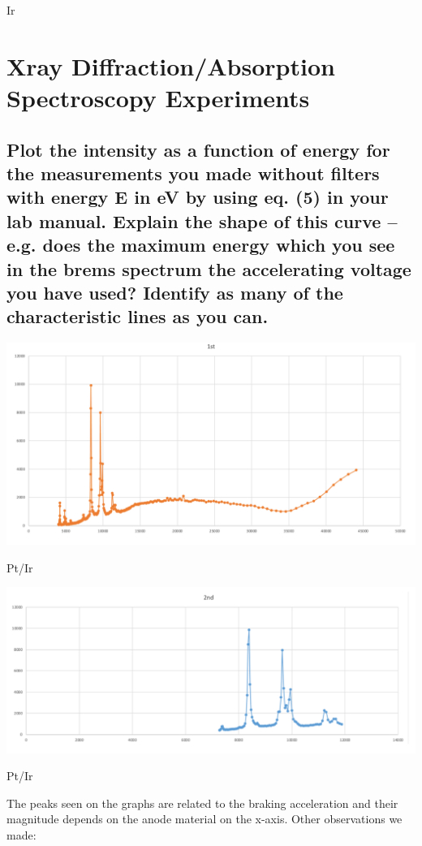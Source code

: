 Ir\documentclass{article}
\begin{document}
\section{Xray Diffraction/Absorption Spectroscopy Experiments}

\subsection{Plot the intensity as a function of energy for the measurements you made
without filters with energy E in eV by using eq. (5) in your lab manual. Explain
the shape of this curve – e.g. does the maximum energy which you see in the
brems spectrum \match the accelerating voltage you have used? Identify as
many of the characteristic lines as you can.}
\begin{center}
\includegraphics[width=\textwidth,height=\textheight,keepaspectratio]{pictures/3a.png}
\caption{Pt/Ir}
\end{center}

\begin{center}
\includegraphics[width=\textwidth,height=\textheight,keepaspectratio]{pictures/3aa.png}
\caption{Pt/Ir}
\end{center}

The peaks seen on the graphs are related to the braking acceleration and their magnitude depends on the anode material on the x-axis. Other observations we made:
\end{document}

